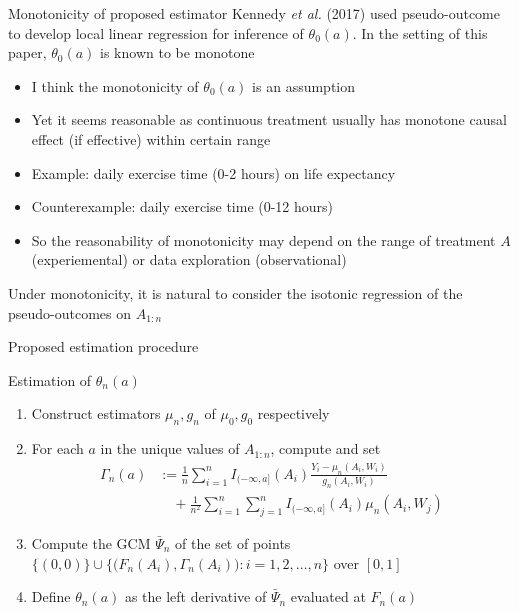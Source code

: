 \documentclass{beamer}
\newcommand{\sn}{\sum_{i=1}^n}
\newcommand{\f}[2]{\frac{#1}{#2}}
\begin{document}
\begin{frame}{Monotonicity of proposed estimator} \label{slide:monotonicity}
  Kennedy \textit{et al.} (2017) used pseudo-outcome to develop local linear regression for inference of $\theta_0(a)$. In the setting of this paper, $\theta_0(a)$ is known to be monotone
  \begin{itemize}
    \item I think the monotonicity of $\theta_0(a)$ is an assumption
    \item Yet it seems reasonable as continuous treatment usually has monotone causal effect (if effective) within certain range
    \item Example: daily exercise time (0-2 hours) on life expectancy
    \item Counterexample: daily exercise time (0-12 hours)
    \item So the reasonability of monotonicity may depend on the range of treatment $A$ (experiemental) or data exploration (observational)
  \end{itemize}
  Under monotonicity, it is natural to consider the isotonic regression of the pseudo-outcomes on $A_{1:n}$
\end{frame}

\begin{frame}{Proposed estimation procedure} \label{slide:procedure}
  \begin{block}{Estimation of $\theta_n(a)$}
    \begin{enumerate}
      \item Construct estimators $\mu_n, g_n$ of $\mu_0, g_0$ respectively
      \item For each $a$ in the unique values of $A_{1:n}$, compute and set
      \begin{align}
        \textstyle \Gamma_n(a) &:= \textstyle \f{1}{n} \sn I_{(-\infty,a]}(A_i) \f{Y_i -\mu_n(A_i,W_i)}{g_n(A_i,W_i)} \nonumber \\
          &\quad \textstyle +\f{1}{n^2} \sn \sum_{j=1}^n I_{(-\infty,a]}(A_i) \mu_n(A_i,W_j) \label{eq:GammaN}
      \end{align}
      \item Compute the GCM $\bar{\Psi}_n$ of the set of points $\{(0,0)\} \cup \{\big( F_n(A_i), \Gamma_n(A_i) \big): i=1,2,\dots,n \}$ over $[0,1]$
      \item Define $\theta_n(a)$ as the left derivative of $\bar{\Psi}_n$ evaluated at $F_n(a)$
    \end{enumerate}
  \end{block}
\end{frame}
\end{document}
